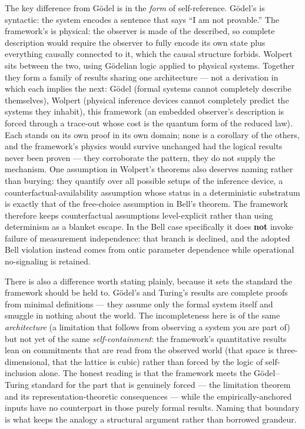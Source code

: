 \documentclass[
]{article}
\begin{document}
The key difference from Gödel is in the \emph{form} of self-reference.
Gödel's is syntactic: the system encodes a sentence that says ``I am not
provable.'' The framework's is physical: the observer is made of the
described, so complete description would require the observer to fully
encode its own state plus everything causally connected to it, which the
causal structure forbids. Wolpert sits between the two, using Gödelian
logic applied to physical systems. Together they form a family of
results sharing one architecture --- not a derivation in which each
implies the next: Gödel (formal systems cannot completely describe
themselves), Wolpert (physical inference devices cannot completely
predict the systems they inhabit), this framework (an embedded
observer's description is forced through a trace-out whose cost is the
quantum form of the reduced law). Each stands on its own proof in its
own domain; none is a corollary of the others, and the framework's
physics would survive unchanged had the logical results never been
proven --- they corroborate the pattern, they do not supply the
mechanism. One assumption in Wolpert's theorems also deserves naming
rather than burying: they quantify over all possible setups of the
inference device, a counterfactual-availability assumption whose status
in a deterministic substratum is exactly that of the free-choice
assumption in Bell's theorem. The framework therefore keeps
counterfactual assumptions level-explicit rather than using determinism
as a blanket escape. In the Bell case specifically it does \textbf{not}
invoke failure of measurement independence: that branch is declined, and
the adopted Bell violation instead comes from ontic parameter dependence
while operational no-signaling is retained.

There is also a difference worth stating plainly, because it sets the
standard the framework should be held to. Gödel's and Turing's results
are complete proofs from minimal definitions --- they assume only the
formal system itself and smuggle in nothing about the world. The
incompleteness here is of the same \emph{architecture} (a limitation
that follows from observing a system you are part of) but not yet of the
same \emph{self-containment}: the framework's quantitative results lean
on commitments that are read from the observed world (that space is
three-dimensional, that the lattice is cubic) rather than forced by the
logic of self-inclusion alone. The honest reading is that the framework
meets the Gödel--Turing standard for the part that is genuinely forced
--- the limitation theorem and its representation-theoretic consequences
--- while the empirically-anchored inputs have no counterpart in those
purely formal results. Naming that boundary is what keeps the analogy a
structural argument rather than borrowed grandeur.
\end{document}
